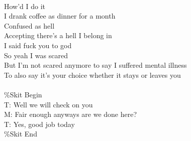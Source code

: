 \documentclass[12pt, b5paper, oneside]{book}
\begin{document}
\\How'd I do it
\\I drank coffee as dinner for a month
\\Confused as hell
\\Accepting there's a hell I belong in
\\I said fuck you to god
\\So yeah I was scared
\\But I'm not scared anymore to say I suffered mental illness
\\To also say it's your choice whether it stays or leaves you
%
\\\\\%Skit Begin
\\T: Well we will check on you
\\M: Fair enough anyways are we done here?
\\T: Yes, good job today
\\\%Skit End 
\newpage
\end{document}
